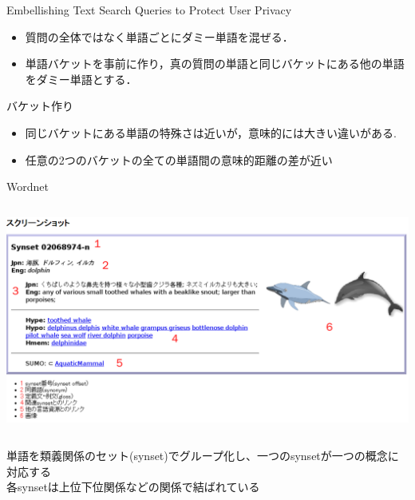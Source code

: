 \documentclass[14pt,xcolor=dvipsnames,table,dvipdfmx]{beamer}
\begin{document}
\begin{frame}{Embellishing Text Search Queries to Protect User Privacy \cite{embellishing2010}}
	\begin{block}{}
		\begin{itemize}
			\item	質問の全体ではなく単語ごとにダミー単語を混ぜる．
			\item	単語バケットを事前に作り，真の質問の単語と同じバケットにある他の単語をダミー単語とする．
		\end{itemize}
	\end{block}
	\begin{block}{バケット作り}
		\begin{itemize}
			\item	同じバケットにある単語の特殊さは近いが，意味的には大きい違いがある. 
			\item	任意の2つのバケットの全ての単語間の意味的距離の差が近い
		\end{itemize}
	\end{block}
\end{frame}

\begin{frame}{Wordnet}
\fontsize{12pt}{7.2}\selectfont
	\begin{columns}[t]
		\begin{column}{1.0\textwidth} %
			\includegraphics[width=\columnwidth]{photo14.png}
		\end{column}
	\end{columns}
	\begin{block}{}
		単語を類義関係のセット(synset)でグループ化し、一つのsynsetが一つの概念に対応する \\
		各synsetは上位下位関係などの関係で結ばれている
	\end{block}
\end{frame}
\end{document}
